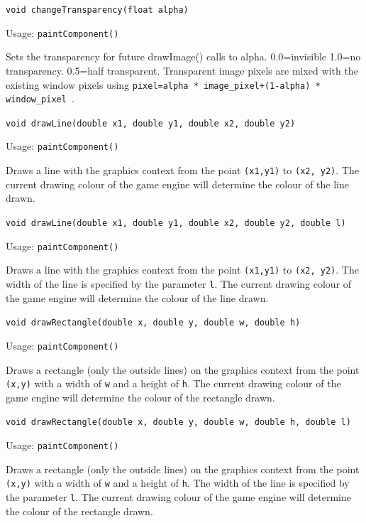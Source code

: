 \documentclass[a4paper, 10pt]{report}
\begin{document}
{\large {\tt void changeTransparency(float alpha)}}

Usage: {\tt paintComponent()}

Sets the transparency for future drawImage() calls to alpha. 0.0=invisible 1.0=no transparency. 0.5=half transparent. Transparent image pixels are mixed with the existing window pixels using {\tt pixel=alpha * image\_pixel+(1-alpha) * window\_pixel }. 

\hrulefill

{\large {\tt void drawLine(double x1, double y1, double x2, double y2)}}

Usage: {\tt paintComponent()}

Draws a line with the graphics context from the point {\tt (x1,y1)} to {\tt (x2, y2)}. The current drawing colour of the game engine will determine the colour of the line drawn.

\hrulefill

{\large {\tt void drawLine(double x1, double y1, double x2, double y2, double l)}}

Usage: {\tt paintComponent()}

Draws a line with the graphics context from the point {\tt (x1,y1)} to {\tt (x2, y2)}. The width of the line is specified by the parameter {\tt l}. The current drawing colour of the game engine will determine the colour of the line drawn.

\hrulefill

{\large {\tt void drawRectangle(double x, double y, double w, double h)}}

Usage: {\tt paintComponent()}

Draws a rectangle (only the outside lines) on the graphics context from the point {\tt (x,y)} with a width of {\tt w} and a height of {\tt h}. The current drawing colour of the game engine will determine the colour of the rectangle drawn.

\hrulefill

{\large {\tt void drawRectangle(double x, double y, double w, double h, double l)}}

Usage: {\tt paintComponent()}

Draws a rectangle (only the outside lines) on the graphics context from the point {\tt (x,y)} with a width of {\tt w} and a height of {\tt h}. The width of the line is specified by the parameter {\tt l}. The current drawing colour of the game engine will determine the colour of the rectangle drawn.
\end{document}
